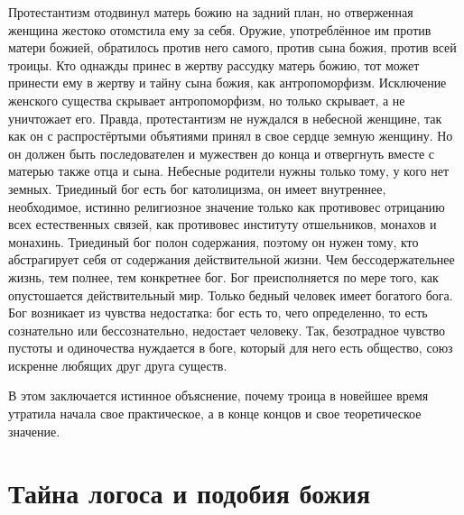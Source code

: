 \documentclass[12pt,oneside]{book}
\begin{document}
Протестантизм отодвинул матерь божию на задний план\dag\let\svthefootnote\thefootnote\let\thefootnote\relax{}\let\thefootnote\svthefootnote, но отверженная женщина жестоко отомстила ему за себя. Оружие, употреблённое им против матери божией, обратилось против него самого, против сына божия, против всей троицы. Кто однажды принес в жертву рассудку матерь божию, тот может принести ему в жертву и тайну сына божия, как антропоморфизм. Исключение женского существа скрывает антропоморфизм, но только скрывает, а не уничтожает его. Правда, протестантизм не нуждался в небесной женщине, так как он с распростёртыми объятиями принял в свое сердце земную женщину. Но он должен быть последователен и мужествен до конца и отвергнуть вместе с матерью также отца и сына. Небесные родители нужны только тому, у кого нет земных. Триединый бог есть бог католицизма, он имеет внутреннее, необходимое, истинно религиозное значение только как противовес отрицанию всех естественных связей, как противовес институту отшельников, монахов и монахинь\ddag\let\svthefootnote\thefootnote\let\thefootnote\relax{}\let\thefootnote\svthefootnote. Триединый бог полон содержания, поэтому он нужен тому, кто абстрагирует себя от содержания действительной жизни. Чем бессодержательнее жизнь, тем полнее, тем конкретнее бог. Бог преисполняется по мере того, как опустошается действительный мир. Только бедный человек имеет богатого бога. Бог возникает из чувства недостатка: бог есть то, чего определенно, то есть сознательно или бессознательно, недостает человеку. Так, безотрадное чувство пустоты и одиночества нуждается в боге, который для него есть общество, союз искренне любящих друг друга существ.


В этом заключается истинное объяснение, почему троица в новейшее время утратила начала свое практическое, а в конце концов и свое теоретическое значение.




\chapter{Тайна логоса и подобия божия}
\end{document}
